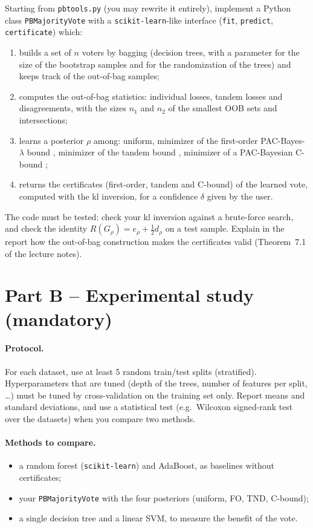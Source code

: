 \documentclass[11pt]{article}
\newcommand{\code}[1]{\texttt{#1}}
\begin{document}
Starting from \code{pbtools.py} (you may rewrite it entirely), implement a Python class
\code{PBMajorityVote} with a \code{scikit-learn}-like interface (\code{fit}, \code{predict},
\code{certificate}) which:
\begin{enumerate}
\item builds a set of $n$ voters by bagging (decision trees, with a parameter for the size of the bootstrap
      samples and for the randomization of the trees) and keeps track of the out-of-bag samples;
\item computes the out-of-bag statistics: individual losses, tandem losses and disagreements, with the sizes
      $n_1$ and $n_2$ of the smallest OOB sets and intersections;
\item learns a posterior $\rho$ among: uniform, minimizer of the first-order PAC-Bayes-$\lambda$ bound
      \citep{thiemann2017strongly}, minimizer of the tandem bound \citep{masegosa2020second}, minimizer of a
      PAC-Bayesian C-bound \citep{germain2015risk,viallard2021self};
\item returns the certificates (first-order, tandem and C-bound) of the learned vote, computed with the kl
      inversion, for a confidence $\delta$ given by the user.
\end{enumerate}
The code must be tested: check your kl inversion against a brute-force search, and check the identity
$R(G_\rho)=e_\rho+\frac12d_\rho$ on a test sample. Explain in the report how the out-of-bag construction
makes the certificates valid (Theorem~7.1 of the lecture notes).

\section{Part B -- Experimental study (mandatory)}

\paragraph{Protocol.} For each dataset, use at least 5 random train/test splits (stratified). Hyperparameters
that are tuned (depth of the trees, number of features per split, \dots) must be tuned by cross-validation on
the training set only. Report means and standard deviations, and use a statistical test (e.g.\ Wilcoxon signed-rank
test over the datasets) when you compare two methods.

\paragraph{Methods to compare.}
\begin{itemize}
\item a random forest (\code{scikit-learn}) and AdaBoost, as baselines without certificates;
\item your \code{PBMajorityVote} with the four posteriors (uniform, FO, TND, C-bound);
\item a single decision tree and a linear SVM, to measure the benefit of the vote.
\end{itemize}
\end{document}
